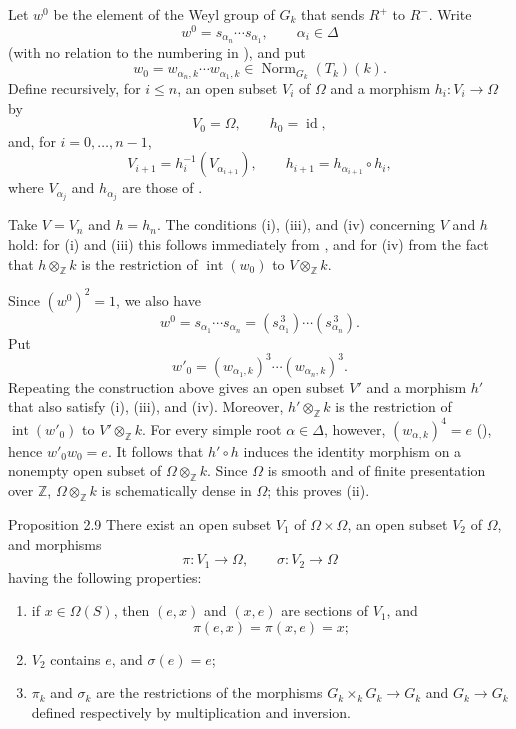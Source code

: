 Let \(w^0\) be the element of the Weyl group of \(G_k\) that sends \(R^+\)
to \(R^-\). Write
\[
 w^0=s_{\alpha_n}\cdots s_{\alpha_1},\qquad \alpha_i\in\Delta
\]
(with no relation to the numbering in ), and put
\[
 w_0=w_{\alpha_n,k}\cdots w_{\alpha_1,k}
 \in\operatorname{Norm}_{G_k}(T_k)(k).
\]
Define recursively, for \(i\leq n\), an open subset \(V_i\) of \(\Omega\)
and a morphism \(h_i\colon V_i\to\Omega\) by
\[
 V_0=\Omega,\qquad h_0=\operatorname{id},
\]
and, for \(i=0,\ldots,n-1\),
\[
 V_{i+1}=h_i^{-1}(V_{\alpha_{i+1}}),\qquad
 h_{i+1}=h_{\alpha_{i+1}}\circ h_i,
\]
where \(V_{\alpha_j}\) and \(h_{\alpha_j}\) are those of .

Take \(V=V_n\) and \(h=h_n\). The conditions (i), (iii), and (iv) concerning
\(V\) and \(h\) hold: for (i) and (iii) this follows immediately from
, and for (iv) from the fact that \(h\otimes_{\mathbb Z}k\) is the
restriction of \(\operatorname{int}(w_0)\) to
\(V\otimes_{\mathbb Z}k\).

Since \((w^0)^2=1\), we also have
\[
 w^0=s_{\alpha_1}\cdots s_{\alpha_n}
 =(s_{\alpha_1}^{\,3})\cdots(s_{\alpha_n}^{\,3}).
\]
Put
\[
 w'_0=(w_{\alpha_1,k})^3\cdots(w_{\alpha_n,k})^3.
\]
Repeating the construction above gives an open subset \(V'\) and a
morphism \(h'\) that also satisfy (i), (iii), and (iv). Moreover,
\(h'\otimes_{\mathbb Z}k\) is the restriction of
\(\operatorname{int}(w'_0)\) to \(V'\otimes_{\mathbb Z}k\). For every
simple root \(\alpha\in\Delta\), however,
\((w_{\alpha,k})^4=e\) (), hence \(w'_0w_0=e\).
It follows that \(h'\circ h\) induces the identity morphism on a nonempty
open subset of \(\Omega\otimes_{\mathbb Z}k\). Since \(\Omega\) is smooth
and of finite presentation over \(\mathbb Z\),
\(\Omega\otimes_{\mathbb Z}k\) is schematically dense in \(\Omega\);
this proves (ii).

\begin{sgastatement}{Proposition 2.9}
There exist an open subset \(V_1\) of \(\Omega\times\Omega\), an open
subset \(V_2\) of \(\Omega\), and morphisms
\[
 \pi\colon V_1\longrightarrow\Omega,\qquad
 \sigma\colon V_2\longrightarrow\Omega
\]
having the following properties:
\begin{enumerate}[label=\textup{(\roman*)},leftmargin=2.2em]
\item if \(x\in\Omega(S)\), then \((e,x)\) and \((x,e)\) are sections
of \(V_1\), and
\[
 \pi(e,x)=\pi(x,e)=x;
\]
\item \(V_2\) contains \(e\), and \(\sigma(e)=e\);
\item{} \(\pi_k\) and \(\sigma_k\) are the restrictions of the morphisms
\(G_k\times_kG_k\to G_k\) and \(G_k\to G_k\) defined respectively by
multiplication and inversion.
\end{enumerate}
\end{sgastatement}

